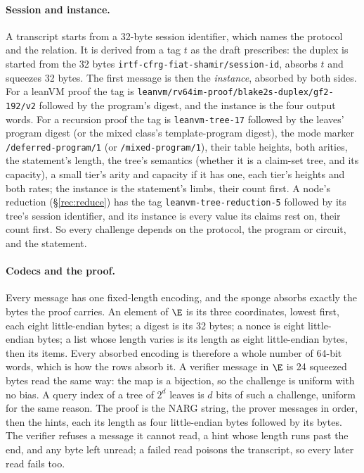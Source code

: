\paragraph{Session and instance.} A transcript starts from a 32-byte session identifier, which names the protocol and the relation. It is derived from a tag $t$ as the draft prescribes: the duplex is started from the 32 bytes \texttt{irtf-cfrg-fiat-shamir/session-id}, absorbs $t$ and squeezes 32 bytes. The first message is then the \emph{instance}, absorbed by both sides. For a leanVM proof the tag is \texttt{leanvm/rv64im-proof/blake2s-duplex/gf2-192/v2} followed by the program's digest, and the instance is the four output words. For a recursion proof the tag is \texttt{leanvm-tree-17} followed by the leaves' program digest (or the mixed class's template-program digest), the mode marker \texttt{/deferred-program/1} (or \texttt{/mixed-program/1}), their table heights, both arities, the statement's length, the tree's semantics (whether it is a claim-set tree, and its capacity), a small tier's arity and capacity if it has one, each tier's heights and both rates; the instance is the statement's limbs, their count first. A node's reduction (\S\ref{rec:reduce}) has the tag \texttt{leanvm-tree-reduction-5} followed by its tree's session identifier, and its instance is every value its claims rest on, their count first. So every challenge depends on the protocol, the program or circuit, and the statement.

\paragraph{Codecs and the proof.} Every message has one fixed-length encoding, and the sponge absorbs exactly the bytes the proof carries. An element of $\E$ is its three coordinates, lowest first, each eight little-endian bytes; a digest is its 32 bytes; a nonce is eight little-endian bytes; a list whose length varies is its length as eight little-endian bytes, then its items. Every absorbed encoding is therefore a whole number of 64-bit words, which is how the rows absorb it. A verifier message in $\E$ is 24 squeezed bytes read the same way: the map is a bijection, so the challenge is uniform with no bias. A query index of a tree of $2^d$ leaves is $d$ bits of such a challenge, uniform for the same reason. The proof is the NARG string, the prover messages in order, then the hints, each its length as four little-endian bytes followed by its bytes. The verifier refuses a message it cannot read, a hint whose length runs past the end, and any byte left unread; a failed read poisons the transcript, so every later read fails too.

